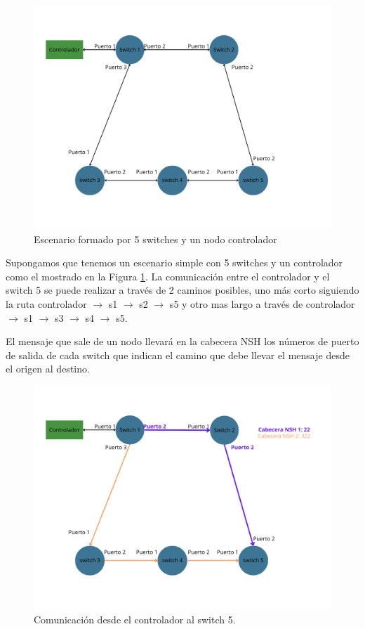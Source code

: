 \documentclass[a4paper, 12pt]{book}
\begin{document}
	\begin{figure}[H]
		\centering
		\includegraphics[width=16cm, keepaspectratio]{img/Ejemplo Periplus 1}
		\caption{Escenario formado por 5 switches y un nodo controlador}
		\label{figura:PeriplusEj1}
	\end{figure}
	
	Supongamos que tenemos un escenario simple con 5 switches y un controlador como el mostrado en la Figura \ref{figura:PeriplusEj1}. La comunicación entre el controlador y el switch 5 se puede realizar a través de 2 caminos posibles, uno más corto siguiendo la ruta controlador $\rightarrow$ s1 $\rightarrow$ s2 $\rightarrow$ s5 y otro mas largo a través de controlador $\rightarrow$ s1 $\rightarrow$ s3 $\rightarrow$ s4 $\rightarrow$ s5. 
	
	El mensaje que sale de un nodo llevará en la cabecera NSH los números de puerto de salida de cada
	switch que indican el camino que debe llevar el mensaje desde el origen al destino.
	
	\begin{figure}[H]
		\centering
		\includegraphics[width=16cm, keepaspectratio]{img/Ejemplo Periplus 2}
		\caption{Comunicación desde el controlador al switch 5.}
		\label{figura:PeriplusEj2}
	\end{figure}
	
\end{document}

